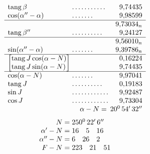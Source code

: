 \[
\begin{array}{l@{\;}l@{\;}r}
\operatorname{tang}\beta&\mathord{.}\,\mathord{.}\,\mathord{.}\,\mathord{.}\,\mathord{.}\,\mathord{.}\,\mathord{.}\,\mathord{.}\,\mathord{.}\,\mathord{.}\,\mathord{.}&9{,}74435\\
\cos(\alpha''-\alpha)&\mathord{.}\,\mathord{.}\,\mathord{.}\,\mathord{.}\,\mathord{.}\,\mathord{.}\,\mathord{.}&9{,}98599\\\hline
&&9{,}73034_n\\
\operatorname{tang}\beta''&\mathord{.}\,\mathord{.}\,\mathord{.}\,\mathord{.}\,\mathord{.}\,\mathord{.}\,\mathord{.}\,\mathord{.}\,\mathord{.}\,\mathord{.}&9{,}24127\\\hline
&&9{,}56010_n\\
\sin(\alpha''-\alpha)&\mathord{.}\,\mathord{.}\,\mathord{.}\,\mathord{.}\,\mathord{.}\,\mathord{.}\,\mathord{.}&9{,}39786_n\\\hline
\left[\begin{array}{@{}l@{}}\operatorname{tang}J\cos(\alpha-N)\\\operatorname{tang}J\sin(\alpha-N)\end{array}\right]&&
\begin{array}{@{}r@{}}0{,}16224\\9{,}74435\end{array}\\\hline
\cos(\alpha-N)&\mathord{.}\,\mathord{.}\,\mathord{.}\,\mathord{.}\,\mathord{.}\,\mathord{.}\,\mathord{.}&9{,}97041\\
\operatorname{tang}J&\mathord{.}\,\mathord{.}\,\mathord{.}\,\mathord{.}\,\mathord{.}\,\mathord{.}\,\mathord{.}\,\mathord{.}\,\mathord{.}\,\mathord{.}&0{,}19183\\
\sin J&\mathord{.}\,\mathord{.}\,\mathord{.}\,\mathord{.}\,\mathord{.}\,\mathord{.}\,\mathord{.}\,\mathord{.}\,\mathord{.}\,\mathord{.}\,\mathord{.}\,\mathord{.}&9{,}92487\\
\cos J&\mathord{.}\,\mathord{.}\,\mathord{.}\,\mathord{.}\,\mathord{.}\,\mathord{.}\,\mathord{.}\,\mathord{.}\,\mathord{.}\,\mathord{.}\,\mathord{.}\,\mathord{.}&9{,}73304\\
\multicolumn{2}{r}{\alpha-N=}&20^{0}\,54'\,32''
\end{array}
\]
\[
\begin{array}{r@{\;}l}
N=&250^{0}\,22'\,6''\\
\alpha'-N=&16\quad5\quad16\\
\alpha''-N=&6\quad26\quad2\\
F-N=&223\quad21\quad51
\end{array}
\]
